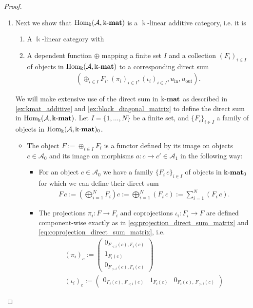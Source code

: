 \begin{proof}
\begin{enumerate}
\item Next we show that $\mathrm{Hom_{\Bbbk}}(\mathcal{A},\Bbbk\textnormal{-}\mathbf{mat})$ is a $\Bbbk$-linear additive category, i.e. it is
\begin{enumerate}[align=left, leftmargin=0pt]
\renewcommand{\labelenumii}{(\roman{enumii})}
\item A $\Bbbk$-linear category with
\item A dependent function $\oplus$ mapping a finite set $I$ and a collection $(F_{i})_{i\in I}$ of objects in $\mathrm{Hom_{\Bbbk}}(\mathcal{A},\Bbbk\textnormal{-}\mathbf{mat})$
to a corresponding direct sum
\begin{align*}
( \oplus_{i\in I} F_{i}, (\pi_{i})_{i\in I}, (\iota_{i})_{i\in I}, u_{\mathrm{in}}, u_{\mathrm{out}} ).
\end{align*}
\end{enumerate}
\begin{subproof}[Proof of (ii)]
We will make extensive use of the direct sum in $\Bbbk\textnormal{-}\mathbf{mat}$ as described in \ref{ex:kmat_additive} and \ref{ex:block_diagonal_matrix} to
define the direct sum in $\mathrm{Hom_{\Bbbk}}(\mathcal{A},\Bbbk\textnormal{-}\mathbf{mat})$.
Let $I = \{1,\dots,N\}$ be a finite set, and $\{F_{i} \}_{i \in I}$ a family of objects in $\mathrm{Hom_{\Bbbk}}(\mathcal{A},\Bbbk\textnormal{-}\mathbf{mat})_{0}$.
\begin{itemize}
\item The object $F := \oplus_{i \in I} F_{i}$ is a functor defined by its image on objects $c \in \mathcal{A}_{0}$ and its
image on morphisms $a : c \rightarrow c' \in \mathcal{A}_{1}$ in the following way:
\begin{itemize}
\item For an object $c \in \mathcal{A}_{0}$ we have a family $\{F_{i}\,c \}_{i \in I}$ of objects in $\Bbbk\textnormal{-}\mathbf{mat}_{0}$ for which we can define
their direct sum
\begin{align}
F\,c := \left(\bigoplus_{i = 1}^{N} F_{i}\right)c := \bigoplus_{i = 1}^{N} (F_{i}\,c) := \sum_{i = 1}^{N} (F_{i}\,c).
\end{align}
\item The projections $\pi_{i} : F \rightarrow F_{i}$ and coprojections $\iota_{i} : F_{i} \rightarrow F$ are defined component-wise
exactly as in \eqref{eq:projection_direct_sum_matrix} and \eqref{eq:coprojection_direct_sum_matrix}, i.e.
\begin{align}
(\pi_{i})_{c} :=
\begin{pmatrix}
0_{F_{<i}(c), F_{i}(c)} \\[2pt]
1_{F_{i}(c)} \\[2pt]
0_{F_{>i}(c), F_{i}(c)}
\end{pmatrix} \\[1ex]
(\iota_{i})_{c} := 
\begin{pmatrix}
0_{F_{i}(c),\,F_{<i}(c)} & 1_{F_{i}(c)} & 0_{F_{i}(c),\,F_{>i}(c)}
\end{pmatrix}
\end{align}


\end{itemize}
\end{itemize}
\end{subproof}
\end{enumerate}
\end{proof}
